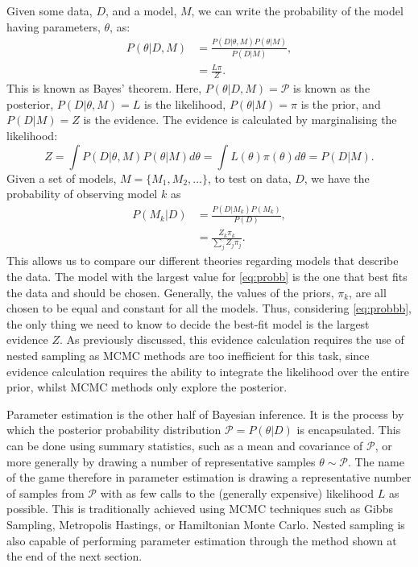 Given some data, $D$, and a model, $M$, we can write the probability of the model having parameters, $\theta$, as:
%
\begin{align}
    P(\theta|D, M) &= \frac{P(D|\theta,M)P(\theta|M)}{P(D|M)},
\label{eq:bayes}\\
    &= \frac{L \pi}{Z}.
\end{align}
%
This is known as Bayes' theorem. Here, $P(\theta|D, M)= \mathcal{P}$ is known as the posterior, $P(D|\theta,M)=L$ is the likelihood, $P(\theta|M)= \pi$ is the prior, and $P(D|M)=Z$ is the evidence. The evidence is calculated by marginalising the likelihood:
%
\begin{equation}
    Z = \int P(D|\theta,M)P(\theta|M) d \theta = \int L(\theta) \pi(\theta) d \theta =P(D|M).
\label{eq:integ}
\end{equation}
%
Given a set of models, $M= \{ M_1,M_2,... \}$, to test on data, $D$, we have the probability of observing model $k$ as~\cite{Handley_2015} 
\begin{align}
    P(M_k|D) &= \frac{P(D|M_k)P(M_k)}{P(D)},
\label{eq:probb}\\
 &= \frac{Z_k \pi_k}{\sum_{j}Z_j \pi_j}.
\label{eq:probbb}
\end{align}
%
This allows us to compare our different theories regarding models that describe the data. The model with the largest value for \cref{eq:probb} is the one that best fits the data and should be chosen. Generally, the values of the priors, $\pi_k$, are all chosen to be equal and constant for all the models. Thus, considering \cref{eq:probbb}, the only thing we need to know to decide the best-fit model is the largest evidence $Z$. As previously discussed, this evidence calculation requires the use of nested sampling as MCMC methods are too inefficient for this task, since evidence calculation requires the ability to integrate the likelihood over the entire prior, whilst MCMC methods only explore the posterior.


Parameter estimation is the other half of Bayesian inference. It is the process by which the posterior probability distribution $\mathcal{P}=P(\theta|D)$ is encapsulated. This can be done using summary statistics, such as a mean and covariance of $\mathcal{P}$, or more generally by drawing a number of representative samples $\theta\sim \mathcal{P}$.  The name of the game therefore in parameter estimation is drawing a representative number of samples from $\mathcal{P}$ with as few calls to the (generally expensive) likelihood $L$ as possible. This is traditionally achieved using MCMC techniques such as Gibbs Sampling, Metropolis Hastings, or Hamiltonian Monte Carlo. Nested sampling is also capable of performing parameter estimation through the method shown at the end of the next section. 

